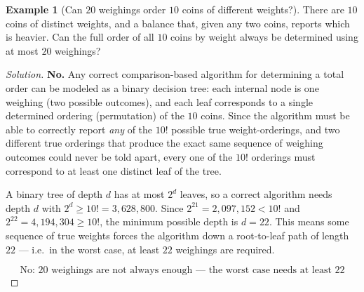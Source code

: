 \documentclass[11pt]{article}
\theoremstyle{definition}
\newtheorem{example}{Example}[section]
\begin{document}
\begin{example}[Can $20$ weighings order $10$ coins of different weights?]
There are $10$ coins of distinct weights, and a balance that, given any two coins, reports which is heavier. Can the full order of all $10$ coins by weight always be determined using at most $20$ weighings?
\end{example}
\begin{proof}[Solution]
\textbf{No.} Any correct comparison-based algorithm for determining a total order can be modeled as a binary decision tree: each internal node is one weighing (two possible outcomes), and each leaf corresponds to a single determined ordering (permutation) of the $10$ coins. Since the algorithm must be able to correctly report \emph{any} of the $10!$ possible true weight-orderings, and two different true orderings that produce the exact same sequence of weighing outcomes could never be told apart, every one of the $10!$ orderings must correspond to at least one distinct leaf of the tree.

A binary tree of depth $d$ has at most $2^d$ leaves, so a correct algorithm needs depth $d$ with $2^d\ge10!=3{,}628{,}800$. Since $2^{21}=2{,}097{,}152<10!$ and $2^{22}=4{,}194{,}304\ge10!$, the minimum possible depth is $d=22$. This means some sequence of true weights forces the algorithm down a root-to-leaf path of length $22$ — i.e.\ in the worst case, at least $22$ weighings are required.

\[
\boxed{\text{No: }20\text{ weighings are not always enough — the worst case needs at least }22}
\]
\end{proof}
\end{document}
